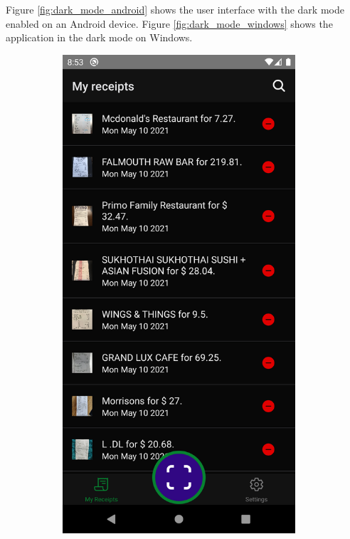 \documentclass[
  printed, %
  table,   %
  oneside, %
  lof,     %
  lot,     %
]{fithesis3}
\newcommand\half{0.45}
\newcommand\subfigsize{0.95}
\begin{document}
Figure \ref{fig:dark_mode_android} shows the user interface with the dark mode enabled on an Android device. Figure \ref{fig:dark_mode_windows} shows the application in the dark mode on Windows.

\begin{figure}
    \centering
    \begin{subfigure}[t]{\half\textwidth}
      \centering
      \includegraphics[width=\subfigsize\textwidth]{figures/screens/android/dark/receipts_list}

\end{subfigure}
\end{figure}
\end{document}
